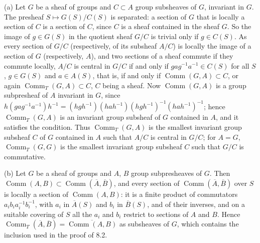 (a) Let \(G\) be a sheaf of groups and \(C\subset A\) group subsheaves of \(G\), invariant in \(G\). The
presheaf \(S\mapsto G(S)/C(S)\) is separated: a section of \(G\) that is locally a section of \(C\) is a
section of \(C\), since \(C\) is a sheaf contained in the sheaf \(G\). So the image of \(g\in G(S)\) in the
quotient sheaf \(G/C\) is trivial only if \(g\in C(S)\). As every section of \(G/C\) (respectively, of its
subsheaf \(A/C\)) is locally the image of a section of \(G\) (respectively, \(A\)), and two sections of a
sheaf commute if they commute locally, \(A/C\) is central in \(G/C\) if and only if
\(gag^{-1}a^{-1}\in C(S)\) for all \(S\), \(g\in G(S)\) and \(a\in A(S)\), that is, if and only if
\(\operatorname{Comm}(G,A)\subset C\), or again \(\operatorname{Comm}_T(G,A)\subset C\), \(C\) being a
sheaf. Now \(\operatorname{Comm}(G,A)\) is a group subpresheaf of \(A\) invariant in \(G\), since
\(h(gag^{-1}a^{-1})h^{-1}=(hgh^{-1})(hah^{-1})(hgh^{-1})^{-1}(hah^{-1})^{-1}\); hence
\(\operatorname{Comm}_T(G,A)\) is an invariant group subsheaf of \(G\) contained in \(A\), and it satisfies
the condition. Thus \(\operatorname{Comm}_T(G,A)\) is the smallest invariant group subsheaf \(C\) of \(G\)
contained in \(A\) such that \(A/C\) is central in \(G/C\); for \(A=G\), \(\operatorname{Comm}_T(G,G)\) is
the smallest invariant group subsheaf \(C\) such that \(G/C\) is commutative.

(b) Let \(G\) be a sheaf of groups and \(A\), \(B\) group subpresheaves of \(G\). Then
\(\operatorname{Comm}(A,B)\subset\operatorname{Comm}(\overline A,\overline B)\), and every section of
\(\operatorname{Comm}(\overline A,\overline B)\) over \(S\) is locally a section of
\(\operatorname{Comm}(A,B)\): it is a finite product of commutators \(a_ib_ia_i^{-1}b_i^{-1}\), with \(a_i\)
in \(\overline A(S)\) and \(b_i\) in \(\overline B(S)\), and of their inverses, and on a suitable covering of
\(S\) all the \(a_i\) and \(b_i\) restrict to sections of \(A\) and \(B\). Hence
\(\operatorname{Comm}_T(\overline A,\overline B)=\overline{\operatorname{Comm}(A,B)}\) as subsheaves of
\(G\), which contains the inclusion used in the proof of 8.2.
